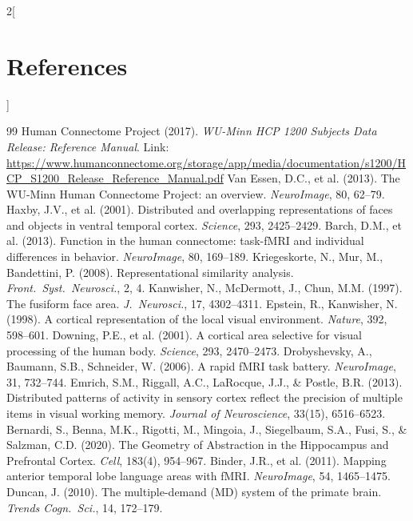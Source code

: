 \documentclass[10pt,a4paper]{article}
\begin{document}
\begingroup
\footnotesize
\setlength{\parskip}{0pt}
\begin{multicols}{2}[\section*{References}]
\renewcommand{\section}[2]{} %
\begin{thebibliography}{99}
\setlength{\itemsep}{0.5pt}
 Human Connectome Project (2017). \emph{WU-Minn HCP 1200 Subjects Data Release: Reference Manual}. 
Link: {\small{}\url{https://www.humanconnectome.org/storage/app/media/documentation/s1200/HCP_S1200_Release_Reference_Manual.pdf}}
 Van Essen, D.C., et al. (2013). The WU-Minn Human Connectome Project: an overview. \emph{NeuroImage}, 80, 62--79.
 Haxby, J.V., et al. (2001). Distributed and overlapping representations of faces and objects in ventral temporal cortex. \emph{Science}, 293, 2425--2429.
 Barch, D.M., et al. (2013). Function in the human connectome: task-fMRI and individual differences in behavior. \emph{NeuroImage}, 80, 169--189.
 Kriegeskorte, N., Mur, M., Bandettini, P. (2008). Representational similarity analysis. \emph{Front.\ Syst.\ Neurosci.}, 2, 4.
 Kanwisher, N., McDermott, J., Chun, M.M. (1997). The fusiform face area. \emph{J.\ Neurosci.}, 17, 4302--4311.
 Epstein, R., Kanwisher, N. (1998). A cortical representation of the local visual environment. \emph{Nature}, 392, 598--601.
 Downing, P.E., et al. (2001). A cortical area selective for visual processing of the human body. \emph{Science}, 293, 2470--2473.
 Drobyshevsky, A., Baumann, S.B., Schneider, W. (2006). A rapid fMRI task battery. \emph{NeuroImage}, 31, 732--744.
 Emrich, S.M., Riggall, A.C., LaRocque, J.J., \& Postle, B.R. (2013). Distributed patterns of activity in sensory cortex reflect the precision of multiple items in visual working memory. \emph{Journal of Neuroscience}, 33(15), 6516--6523.
 Bernardi, S., Benna, M.K., Rigotti, M., Mingoia, J., Siegelbaum, S.A., Fusi, S., \& Salzman, C.D. (2020). The Geometry of Abstraction in the Hippocampus and Prefrontal Cortex. \emph{Cell}, 183(4), 954--967.
 Binder, J.R., et al. (2011). Mapping anterior temporal lobe language areas with fMRI. \emph{NeuroImage}, 54, 1465--1475.
 Duncan, J. (2010). The multiple-demand (MD) system of the primate brain. \emph{Trends Cogn.\ Sci.}, 14, 172--179.
\end{thebibliography}
\end{multicols}
\endgroup

\enddocument
\end{document}
